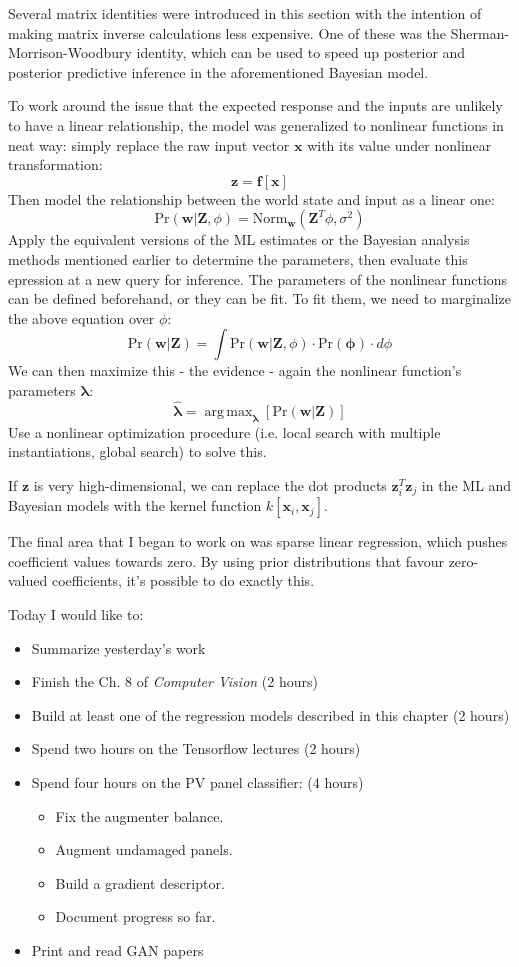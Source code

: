 \documentclass[idxtotoc,hyperref,openany]{labbook} %
\DeclareMathOperator*{\argmax}{arg\,max}
\begin{document}
Several matrix identities were introduced in this section with the intention of making matrix inverse calculations less expensive. One of these was the Sherman-Morrison-Woodbury identity, which can be used to speed up posterior and posterior predictive inference in the aforementioned Bayesian model.

To work around the issue that the expected response and the inputs are unlikely to have a linear relationship, the model was generalized to nonlinear functions in neat way: simply replace the raw input vector $\mathbf{x}$ with its value under nonlinear transformation:
\[
	\mathbf{z} = \mathbf{f}[\mathbf{x}]
\]
Then model the relationship between the world state and input as a linear one:
\[
	\text{Pr}(\mathbf{w}|\mathbf{Z}, \phi) = \text{Norm}_{\mathbf{w}}(\mathbf{Z}^T\phi, \sigma^2)
\]
Apply the equivalent versions of the ML estimates or the Bayesian analysis methods mentioned earlier to determine the parameters, then evaluate this epression at a new query for inference. The parameters of the nonlinear functions can be defined beforehand, or they can be fit. To fit them, we need to marginalize the above equation over $\phi$:
\[
	\text{Pr}(\mathbf{w}|\mathbf{Z}) = \int \text{Pr}(\mathbf{w}|\mathbf{Z}, \phi)\cdot\text{Pr}(\mathbf{\phi})\cdot d\phi
\]
We can then maximize this - the evidence - again the nonlinear function's parameters $\mathbf{\lambda}$:
\[
	\hat{\mathbf{\lambda}} = \argmax_{\mathbf{\lambda}} [\text{Pr}(\mathbf{w}|\mathbf{Z})]
\]
Use a nonlinear optimization procedure (i.e. local search with multiple instantiations, global search) to solve this.

If $\mathbf{z}$ is very high-dimensional, we can replace the dot products $\mathbf{z}_i^T\mathbf{z}_j$ in the ML and Bayesian models with the kernel function $k[\mathbf{x}_i, \mathbf{x}_j]$. 

The final area that I began to work on was sparse linear regression, which pushes coefficient values towards zero. By using prior distributions that favour zero-valued coefficients, it's possible to do exactly this.


 Today I would like to:
 \begin{itemize}
 	\item Summarize yesterday's work
 	\item Finish the Ch. 8 of \emph{Computer Vision} (2 hours)
 	\item Build at least one of the regression models described in this chapter (2 hours)
 	\item Spend two hours on the Tensorflow lectures (2 hours)
 	\item Spend four hours on the PV panel classifier: (4 hours)
 	\begin{itemize}
 		\item Fix the augmenter balance.
 		\item Augment undamaged panels.
 		\item Build a gradient descriptor.
 		\item Document progress so far.
 	\end{itemize}
 	\item Print and read GAN papers
 \end{itemize}
 
\end{document}
